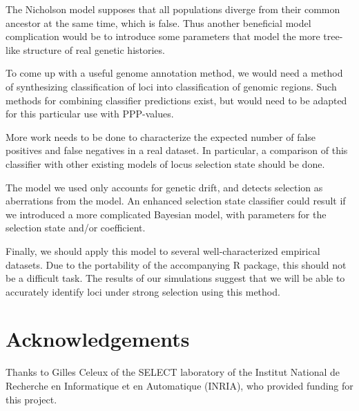 \documentclass[a4paper,12pt]{article}
\begin{document}
The Nicholson model supposes that all populations diverge from their
common ancestor at the same time, which is false. Thus another
beneficial model complication would be to introduce some parameters
that model the more tree-like structure of real genetic histories.

To come up with a useful genome annotation method, we would need a
method of synthesizing classification of loci into classification of
genomic regions. Such methods for combining classifier predictions
exist, but would need to be adapted for this particular use with
PPP-values.

More work needs to be done to characterize the expected number of
false positives and false negatives in a real dataset. In particular,
a comparison of this classifier with other existing models of locus
selection state should be done.

The model we used only accounts for genetic drift, and detects
selection as aberrations from the model. An enhanced selection state
classifier could result if we introduced a more complicated Bayesian
model, with parameters for the selection state and/or coefficient.

Finally, we should apply this model to several well-characterized
empirical datasets. Due to the portability of the accompanying R
package, this should not be a difficult task. The results of our
simulations suggest that we will be able to accurately identify loci
under strong selection using this method.

\section{Acknowledgements}

Thanks to Gilles Celeux of the SELECT laboratory of the Institut
National de Recherche en Informatique et en Automatique (INRIA), who
provided funding for this project.



\end{document}
